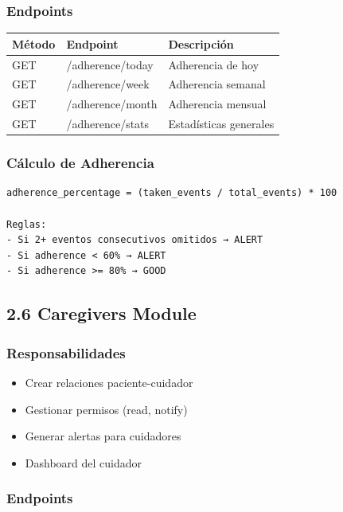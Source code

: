 \documentclass[12pt,a4paper]{article}
\begin{document}
\subsubsection{Endpoints}

\begin{center}
\begin{tabular}{|l|l|l|}
\hline
\rowcolor{lightblue}
\textbf{Método} & \textbf{Endpoint} & \textbf{Descripción} \\
\hline
GET & /adherence/today & Adherencia de hoy \\
\hline
GET & /adherence/week & Adherencia semanal \\
\hline
GET & /adherence/month & Adherencia mensual \\
\hline
GET & /adherence/stats & Estadísticas generales \\
\hline
\end{tabular}
\end{center}

\subsubsection{Cálculo de Adherencia}

\begin{verbatim}
adherence_percentage = (taken_events / total_events) * 100

Reglas:
- Si 2+ eventos consecutivos omitidos → ALERT
- Si adherence < 60% → ALERT
- Si adherence >= 80% → GOOD
\end{verbatim}

\subsection{2.6 Caregivers Module}

\subsubsection{Responsabilidades}
\begin{itemize}
    \item Crear relaciones paciente-cuidador
    \item Gestionar permisos (read, notify)
    \item Generar alertas para cuidadores
    \item Dashboard del cuidador
\end{itemize}

\subsubsection{Endpoints}
\end{document}
